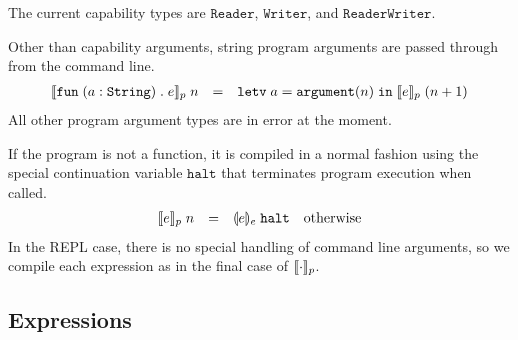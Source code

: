 \documentclass[11pt]{article}
\newcommand{\kw}[1]{\mathtt{#1}}
\begin{document}
The current capability types are $\kw{Reader}$, $\kw{Writer}$, and $\kw{ReaderWriter}$.

Other than capability arguments, string program arguments are passed through from the command line.
\[
\begin{array}{rcll}
\cmpin{p}{\fune{\arge{a}{\kw{String}}}{e}}{n} & = &
  \letv{a}{\prmv{\kw{argument}}{n}}{\cmpin{p}{e}{(n + 1)}}
  \\
\end{array}
\]
All other program argument types are in error at the moment.

If the program is not a function, it is compiled in a normal fashion using the special continuation variable $\kw{halt}$ that terminates program execution when called.
\[
\begin{array}{rcll}
\cmpin{p}{e}{n} & = &
  \tcmpin{e}{e}{\kw{halt}} &
  \text{otherwise}
\end{array}
\]
In the REPL case, there is no special handling of command line arguments, so we compile each expression as in the final case of $\llbracket \cdot \rrbracket_p$.

\subsection*{Expressions}
\end{document}
